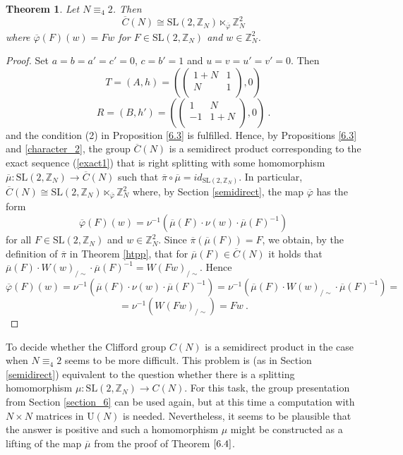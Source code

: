 \documentclass[10pt]{amsart}
\theoremstyle{plain}
\newtheorem{theorem}{Theorem}[section]
\theoremstyle{definition}
\theoremstyle{remark}%
\newcommand{\Z}{\mathbb{Z}}
\newcommand{\SL}{\mathrm{SL}}
\newcommand{\U}{\mathrm{U}}
\newcommand{\mat}[4]{\left(\begin{array}{cc}
 #1 & #2\\
 #3 & #4\\
\end{array}\right)}
\newcommand{\matN}[4]{\left[\begin{array}{cc}
 #1 & #2\\
 #3 & #4\\
\end{array}\right]_N}
\begin{document}
\begin{theorem}\label{6.4}
 Let $N\equiv_4 2$. Then $$
\overline{C}(N) \cong   \SL(2,\mathbb{Z}_N)\ltimes_{\overline{\varphi}} \mathbb{Z}_N^2 
$$
where $\overline{\varphi}(F)(w)=Fw$ for $F\in \SL(2,\mathbb{Z}_N)$ and $w\in\Z_{N}^2$.
\end{theorem}
\begin{proof}
   Set $a=b=a'=c'=0$, $c=b'=1$ and $u=v=u'=v'=0$. Then 
 $$T=(A,h)=\left(\mat{1+N}{1}{N}{1}, 0\right)$$
 $$R=(B,h')=\left(\mat{1}{N}{-1}{1+N}, 0\right)\ .$$
 and the condition (2) in Proposition \ref{6.3} is fulfilled. Hence, by Propositions \ref{6.3} and \ref{character_2}, the group $\overline{C}(N)$ is a semidirect product corresponding to the exact sequence (\ref{exact1}) that is right splitting with some homomorphism $\overline{\mu}:\SL(2,\Z_N)\to \overline{C}(N)$ such that $\overline{\pi}\circ\overline{\mu}=id_{\SL(2,\Z_N)}$. In particular, $
\overline{C}(N) \cong   \SL(2,\mathbb{Z}_N)\ltimes_{\overline{\varphi}} \mathbb{Z}_N^2
$ where, by Section \ref{semidirect}, the map $\overline{\varphi}$ has the form $$\overline{\varphi}(F)(w)=\nu^{-1}\left(\overline{\mu}(F)\cdot \nu(w)\cdot \overline{\mu}(F)^{-1}\right)$$ for all $F\in \SL(2,\mathbb{Z}_N)$ and $w\in \Z_N^2$. Since $\overline{\pi}(\overline{\mu}(F))=F$, we obtain, by the definition of $\overline{\pi}$ in  Theorem \ref{htpp}, that for $\overline{\mu}(F)\in\overline{C}(N)$ it holds that $\overline{\mu}(F)\cdot W(w)_{/\sim}\cdot \overline{\mu}(F)^{-1}=W(Fw)_{/\sim}$. Hence $$\overline{\varphi}(F)(w)=\nu^{-1}\left(\overline{\mu}(F)\cdot \nu(w)\cdot \overline{\mu}(F)^{-1}\right)=\nu^{-1}\left(\overline{\mu}(F)\cdot W(w)_{/\sim}\cdot \overline{\mu}(F)^{-1}\right)=$$
$$=\nu^{-1}\left(W(Fw)_{/\sim}\right)=Fw\ .$$
\end{proof}


To decide whether the Clifford group $C(N)$ is a semidirect product in the case when $N\equiv_4 2$ seems to be more difficult. This problem is (as in Section \ref{semidirect}) equivalent to the question whether there is a splitting homomorphism $\mu:\SL(2,\Z_N)\to C(N)$. For this task, the group presentation from Section \ref{section_6} can be used again, but at this time a computation with $N\times N$ matrices in $\U(N)$ is needed. Nevertheless, it seems to be  plausible that the answer is positive and such a homomorphism $\mu$ might be constructed as a lifting  of the map $\overline{\mu}$ from the proof of Theorem $\ref{6.4}$.
\end{document}
